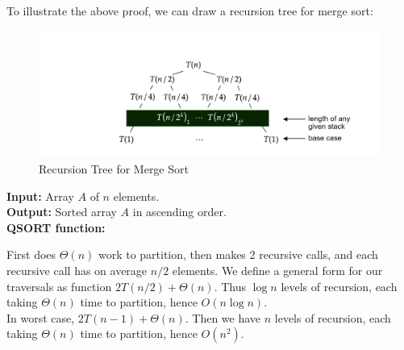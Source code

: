 \newpage

\noindent
To illustrate the above proof, we can draw a recursion tree for merge sort:\\
\vspace{-5em}
\begin{figure}[h]
    \hspace{-12em}
    \includegraphics[width=1.5\textwidth]{sections/recurs/rec_tree.png}
    \caption{Recursion Tree for Merge Sort}
\end{figure}

\vspace{-1em}
\begin{Func}
    \textbf{Input:} Array $A$ of $n$ elements.\\
    \textbf{Output:} Sorted array $A$ in ascending order.\\

    \vspace{-.5em}
    \noindent
    \textbf{QSORT function:}\\
    \begin{algorithm}[H]
        \label{algo:quicksort}
    \end{algorithm}
\end{Func}

\vspace{-1em}
\noindent
\begin{Proof}

    First does $\Theta(n)$ work to partition, then makes 2 recursive calls, and each recursive call 
    has on average $n/2$ elements. We define a general form for our traversals as function $2T(n/2) + \Theta(n)$.
    Thus $\log n$ levels of recursion, each taking $\Theta(n)$ time to partition, hence $O(n \log n)$.\\

    \noindent
    In worst case, $2T(n-1) + \Theta(n)$. Then we have $n$ levels of recursion, each taking $\Theta(n)$ time to partition, hence $O(n^2)$.

\end{Proof}

